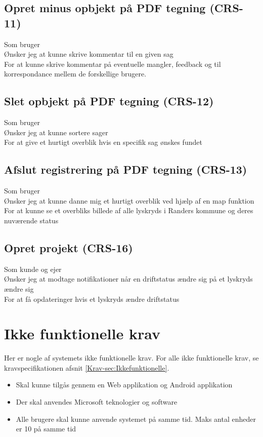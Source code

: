 	\subsection*{Opret minus opbjekt på PDF tegning (CRS-11)}
	Som bruger\\
	Ønsker jeg at kunne skrive kommentar til en given sag\\
	For at kunne skrive kommentar på eventuelle mangler, feedback og til korrespondance mellem de forskellige brugere.

	\subsection*{Slet opbjekt på PDF tegning (CRS-12)}
	Som bruger\\
	Ønsker jeg at kunne sortere sager\\
	For at give et hurtigt overblik hvis en specifik sag ønskes fundet

	\subsection*{Afslut registrering på PDF tegning (CRS-13)}
	Som bruger\\
	Ønsker jeg at kunne danne mig et hurtigt overblik ved hjælp af en map funktion\\
	For at kunne se et overbliks billede af alle lyskryds i Randers kommune  og deres nuværende status
	
	\subsection*{Opret projekt (CRS-16)}
	Som kunde og ejer\\
	Ønsker jeg at modtage notifikationer når en driftstatus ændre sig på et lyskryds ændre sig\\
	For at få opdateringer hvis et lyskryds ændre driftstatus \\
	

	\section{Ikke funktionelle krav}
	Her er nogle af systemets ikke funktionelle krav. For alle ikke funktionelle krav, se kravspecifikationen afsnit \ref{Krav-sec:Ikkefunktionelle}.
	\begin{itemize}[-]
		\itemsep 0.3em 
		\item Skal kunne tilgås gennem en Web applikation og Android applikation
		\item Der skal anvendes Microsoft teknologier og software
		\item Alle brugere skal kunne anvende systemet på samme tid. Maks antal enheder er 10 på samme tid %
	\end{itemize}


